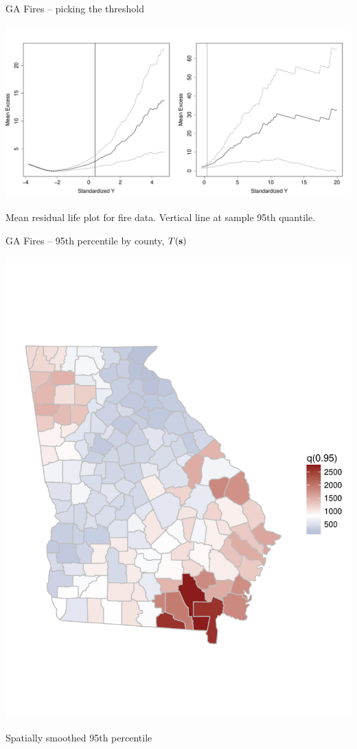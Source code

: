 \documentclass{beamer}
\begin{document}
\begin{frame}{GA Fires -- picking the threshold}
	\begin{center}
		\includegraphics[width=1\textwidth]{fire-mrl-plots}

		Mean residual life plot for fire data. Vertical line at sample 95th quantile.
	\end{center}
\end{frame}

\begin{frame}{GA Fires -- 95th percentile by county, $T(\mathbf{s})$}\vspace{-35pt}
	\begin{center}
		\includegraphics[height=0.95\textheight]{fire-spatial-q95}
		\vspace{-3em}

		Spatially smoothed 95th percentile
	\end{center}
\end{frame}
\end{document}
